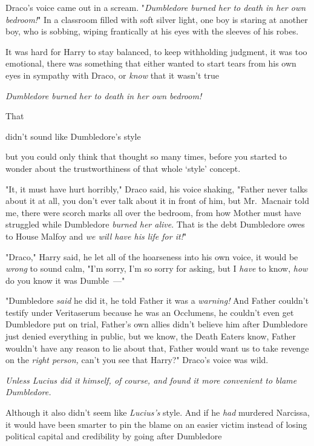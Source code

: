 Draco's voice came out in a scream. "\emph{Dumbledore burned her to death in
her own bedroom!}"
\sbreak
In a classroom filled with soft silver light, one boy is staring at another
boy, who is sobbing, wiping frantically at his eyes with the sleeves of his
robes.

It was hard for Harry to stay balanced, to keep withholding judgment, it was
too emotional, there was something that either wanted to start tears from his
own eyes in sympathy with Draco, or \emph{know} that it wasn't true{\el}

\emph{Dumbledore burned her to death in her own bedroom!}

That{\el}

{\el} didn't sound like Dumbledore's style{\el}

{\el} but you could only think that thought so many times, before you started
to wonder about the trustworthiness of that whole `style' concept.

"It, it must have hurt horribly," Draco said, his voice shaking, "Father never
talks about it at all, you don't ever talk about it in front of him, but
Mr.~Macnair told me, there were scorch marks all over the bedroom, from how
Mother must have struggled while Dumbledore \emph{burned her alive}. That is
the debt Dumbledore owes to House Malfoy and \emph{we will have his life for
it!}"

"Draco," Harry said, he let all of the hoarseness into his own voice, it would
be \emph{wrong} to sound calm, "I'm sorry, I'm so sorry for asking, but I
\emph{have} to know, \emph{how} do you know it was Dumble~---"

"Dumbledore \emph{said} he did it, he told Father it was a \emph{warning!} And
Father couldn't testify under Veritaserum because he was an Occlumens, he
couldn't even get Dumbledore put on trial, Father's own allies didn't believe
him after Dumbledore just denied everything in public, but we know, the Death
Eaters know, Father wouldn't have any reason to lie about that, Father would
want us to take revenge on the \emph{right person,} can't you see that Harry?"
Draco's voice was wild.

\emph{Unless Lucius did it himself, of course, and found it more convenient to
blame Dumbledore.}

Although{\el} it also didn't seem like \emph{Lucius's} style. And if he
\emph{had} murdered Narcissa, it would have been smarter to pin the blame on an
easier victim instead of losing political capital and credibility by going
after Dumbledore{\el}

